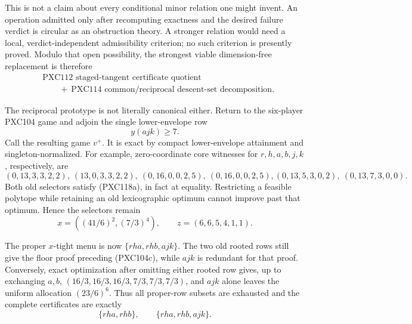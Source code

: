 \documentclass[11pt]{article}
\begin{document}
This is not a claim about every conditional minor relation one might invent.
An operation admitted only after recomputing exactness and the desired
failure verdict is circular as an obstruction theory.  A stronger relation
would need a local, verdict-independent admissibility criterion; no such
criterion is presently proved.  Modulo that open possibility, the strongest
viable dimension-free replacement is therefore
\begin{equation}
\begin{split}
 &\text{PXC112 staged-tangent certificate quotient}\\
 &\qquad+\ \text{PXC114 common/reciprocal descent-set decomposition}.
\end{split}                                                  \tag{PXC117c}
\end{equation}

The reciprocal prototype is not literally canonical either.  Return to the
six-player PXC104 game and adjoin the single lower-envelope row
\begin{equation}
                    y(ajk)\ge 7.                              \tag{PXC118a}
\end{equation}
Call the resulting game \(v^+\).  It is exact by compact lower-envelope
attainment and singleton-normalized.  For example, zero-coordinate core
witnesses for \(r,h,a,b,j,k\), respectively, are
\[
 (0,13,3,3,2,2),\ (13,0,3,3,2,2),\
 (0,16,0,0,2,5),\ (0,16,0,0,2,5),
 (0,13,5,3,0,2),\ (0,13,7,3,0,0).
\]
Both old selectors satisfy (PXC118a), in fact at equality.  Restricting a
feasible polytope while retaining an old lexicographic optimum cannot improve
past that optimum.  Hence the selectors remain
\begin{equation}
 x=\left((41/6)^2,(7/3)^4\right),\qquad
 z=(6,6,5,4,1,1).                                           \tag{PXC118b}
\end{equation}

The proper \(x\)-tight menu is now \(\{rha,rhb,ajk\}\).
The two old rooted rows still give the floor proof preceding (PXC104c), while
\(ajk\) is redundant for that proof.  Conversely, exact optimization after
omitting either rooted row gives, up to exchanging \(a,b\),
\((16/3,16/3,16/3,7/3,7/3,7/3)\), and \(ajk\) alone leaves the uniform
allocation \((23/6)^6\).  Thus all proper-row subsets are exhausted and the
complete certificates are exactly
\begin{equation}
             \{rha,rhb\},\qquad \{rha,rhb,ajk\}.              \tag{PXC118c}
\end{equation}
\end{document}
